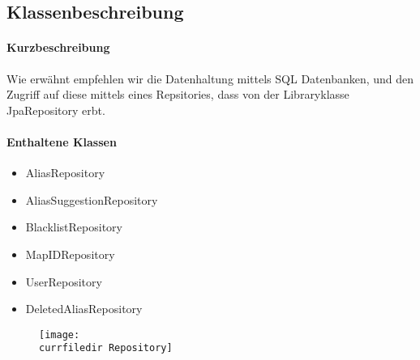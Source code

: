 \subsection*{Klassenbeschreibung}%
\paragraph*{Kurzbeschreibung}
Wie erwähnt empfehlen wir die Datenhaltung mittels SQL Datenbanken, und den Zugriff auf diese mittels eines Repsitories,
dass von der Libraryklasse \dq JpaRepository \dq erbt.

\paragraph*{Enthaltene Klassen}
\begin{itemize}
    \item AliasRepository
    \item AliasSuggestionRepository
    \item BlacklistRepository
    \item MapIDRepository
    \item UserRepository
    \item DeletedAliasRepository
\end{itemize}

\begin{figure}
    \centering
    \texttt{[image: \\currfiledir Repository]}
  \end{figure}
